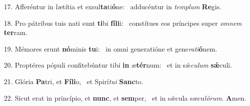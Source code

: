 17. Afferéntur in lætítia et exsul\textbf{ta}ti\textbf{ó}ne: \ast\  adducéntur in \textit{tem}\textit{plum} \textbf{Re}gis.\

18. Pro pátribus tuis nati sunt \textbf{ti}bi \textbf{fí}\textbf{li}i: \ast\  constítues eos príncipes super \textit{om}\textit{nem} \textbf{ter}ram.\

19. Mémores erunt \textbf{nó}minis \textbf{tu}i: \ast\  in omni generatióne et gene\textit{ra}\textit{ti}\textbf{ó}nem.\

20. Proptérea pópuli confitebúntur tibi \textbf{in} æ\textbf{tér}num: \ast\  et in sǽ\textit{cu}\textit{lum} \textbf{sǽ}culi.\

21. Glória \textbf{Pa}tri, et \textbf{Fí}\textbf{li}o, \ast\  et Spirí\textit{tu}\textit{i} \textbf{Sanc}to.\

22. Sicut erat in princípio, et \textbf{nunc}, et \textbf{sem}per, \ast\  et in sǽcula sæcu\textit{ló}\textit{rum}. \textbf{A}men.\

